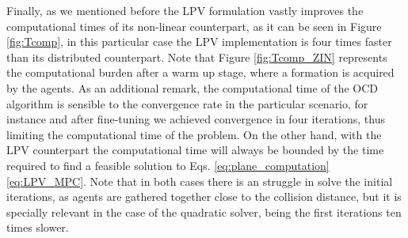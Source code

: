 \documentclass[a4paper,fleqn]{cas-sc}
\begin{document}
Finally, as we mentioned before the LPV formulation vastly improves the computational times of its non-linear counterpart, as it can be seen in Figure \ref{fig:Tcomp}, in this particular case the LPV implementation is four times faster than its distributed counterpart. Note that Figure \ref{fig:Tcomp_ZIN} represents the computational burden after a warm up stage, where a formation is acquired by the agents. As an additional remark, the computational time of the OCD algorithm is sensible to the convergence rate in the particular scenario, for instance and after fine-tuning we achieved convergence in four iterations, thus limiting the computational time of the problem. On the other hand, with the LPV counterpart the computational time will always be bounded by the time required to find a feasible solution to Eqs. \eqref{eq:plane_computation} \eqref{eq:LPV_MPC}. Note that in both cases there is an struggle in solve the initial iterations, as agents are gathered together close to the collision distance, but it is specially relevant in the case of the quadratic solver, being the first iterations ten times slower.\\ 
\end{document}
